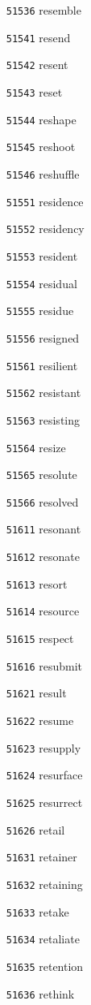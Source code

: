 \documentclass[twoside,11pt]{article}
\begin{document}
\begin{multicols}{5}
\begin{enumerate}
\item[\texttt{51536}] resemble
\item[\texttt{51541}] resend
\item[\texttt{51542}] resent
\item[\texttt{51543}] reset
\item[\texttt{51544}] reshape
\item[\texttt{51545}] reshoot
\item[\texttt{51546}] reshuffle
\item[\texttt{51551}] residence
\item[\texttt{51552}] residency
\item[\texttt{51553}] resident
\item[\texttt{51554}] residual
\item[\texttt{51555}] residue
\item[\texttt{51556}] resigned
\item[\texttt{51561}] resilient
\item[\texttt{51562}] resistant
\item[\texttt{51563}] resisting
\item[\texttt{51564}] resize
\item[\texttt{51565}] resolute
\item[\texttt{51566}] resolved
\item[\texttt{51611}] resonant
\item[\texttt{51612}] resonate
\item[\texttt{51613}] resort
\item[\texttt{51614}] resource
\item[\texttt{51615}] respect
\item[\texttt{51616}] resubmit
\item[\texttt{51621}] result
\item[\texttt{51622}] resume
\item[\texttt{51623}] resupply
\item[\texttt{51624}] resurface
\item[\texttt{51625}] resurrect
\item[\texttt{51626}] retail
\item[\texttt{51631}] retainer
\item[\texttt{51632}] retaining
\item[\texttt{51633}] retake
\item[\texttt{51634}] retaliate
\item[\texttt{51635}] retention
\item[\texttt{51636}] rethink

\end{enumerate}
\end{multicols}
\end{document}
